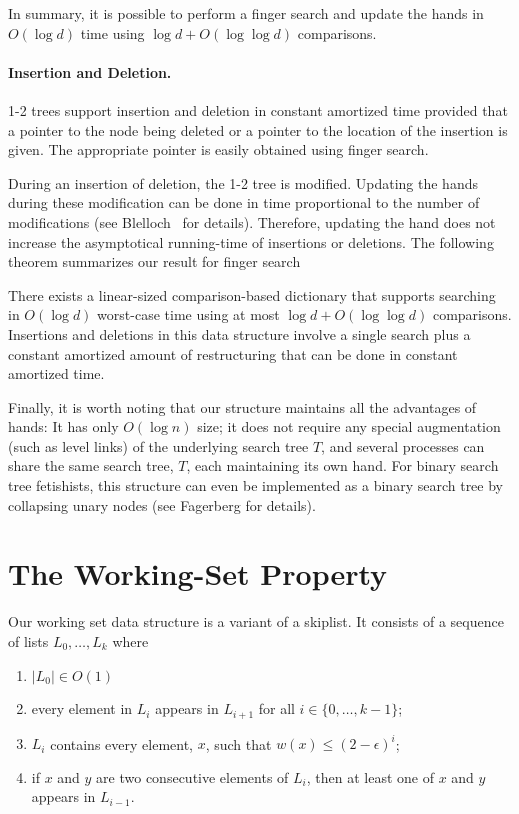 \documentclass{patmorin}
\begin{document}
In summary, it is possible to perform a finger search and update the
hands in $O(\log d)$ time using $\log d+O(\log\log d)$ comparisons.

\paragraph{Insertion and Deletion.} 1-2 trees support insertion and
deletion in constant amortized time provided that a pointer to the node
being deleted or a pointer to the location of the insertion is given.
The appropriate pointer is easily obtained using finger search.

During an insertion of deletion, the 1-2 tree is modified.  Updating the
hands during these modification can be done in time proportional to the
number of modifications (see Blelloch \etal\ for details).   Therefore,
updating the hand does not increase the asymptotical running-time of
insertions or deletions.  The following theorem summarizes our result
for finger search

\begin{thm}
  There exists a linear-sized comparison-based dictionary that
  supports searching in $O(\log d)$ worst-case time using at most $\log
  d+O(\log\log d)$ comparisons.  Insertions and deletions in this data
  structure involve a single search plus a constant amortized amount of
  restructuring that can be done in constant amortized time.
\end{thm}

Finally, it is worth noting that our structure maintains all the
advantages of hands: It has only $O(\log n)$ size; it does not require
any special augmentation (such as level links) of the underlying search
tree $T$, and several processes can share the same search tree, $T$,
each maintaining its own hand.  For binary search tree fetishists, this
structure can even be implemented as a binary search tree by collapsing
unary nodes (see Fagerberg \cite{fXX} for details).


\section{The Working-Set Property}

Our working set data structure is a variant of a skiplist.  It consists of a sequence of lists $L_0,\ldots,L_k$ where
\begin{enumerate}
  \item $|L_0|\in O(1)$
  \item every element in $L_i$ appears in $L_{i+1}$ for all
  $i\in\{0,\ldots,k-1\}$;
  \item $L_i$ contains every element, $x$, such that $w(x)\le (2-\epsilon)^i$;
  \item if $x$ and $y$ are two consecutive elements of $L_i$, then at
  least one of $x$ and $y$ appears in $L_{i-1}$.
\end{enumerate}
\end{document}
